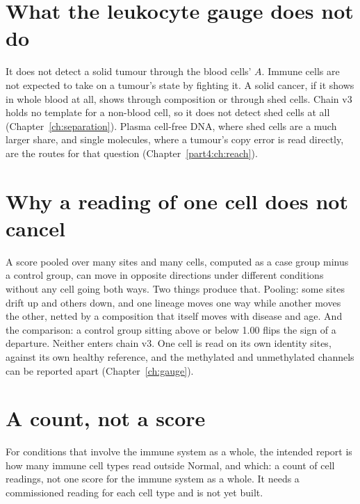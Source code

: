 \section{What the leukocyte gauge does not do}

It does not detect a solid tumour through the blood cells' $A$. Immune cells are not expected to take on a tumour's state by fighting it. \conjecture{} A solid cancer, if it
shows in whole blood at all, shows through composition or through shed cells. Chain v3 holds no template for a non-blood cell, so it does not detect shed cells at all
(Chapter~\ref{ch:separation}). Plasma cell-free DNA, where shed cells are a much larger share, and single molecules, where a tumour's copy error is read directly, are the
routes for that question (Chapter~\ref{part4:ch:reach}).

\section{Why a reading of one cell does not cancel}

A score pooled over many sites and many cells, computed as a case group minus a control group, can move in opposite directions under different conditions without any cell going
both ways. Two things produce that. Pooling: some sites drift up and others down, and one lineage moves one way while another moves the other, netted by a composition that itself
moves with disease and age. And the comparison: a control group sitting above or below 1.00 flips the sign of a departure. Neither enters chain v3. One cell is read on its own
identity sites, against its own healthy reference, and the methylated and unmethylated channels can be reported apart (Chapter~\ref{ch:gauge}).

\section{A count, not a score}

For conditions that involve the immune system as a whole, the intended report is how many immune cell types read outside Normal, and which: a count of cell readings, not one score
for the immune system as a whole. It needs a commissioned reading for each cell type and is not yet built. \openprob

